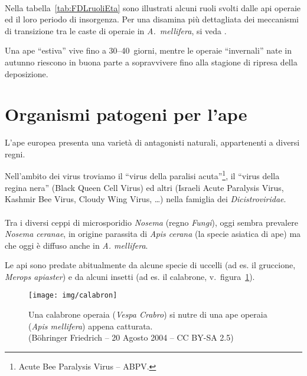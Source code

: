 \paragraph{}
Nella tabella~\ref{tab:FDLruoliEta} sono illustrati alcuni ruoli svolti dalle api operaie ed il loro periodo di insorgenza.
Per una disamina più dettagliata dei meccanismi di transizione tra le caste di operaie in \emph{A.~mellifera},
si veda \cite{meccanica}.

Una ape ``estiva'' vive fino a 30--40~giorni, mentre le operaie ``invernali'' nate in autunno
riescono in buona parte a sopravvivere fino alla stagione di ripresa della deposizione.




\section{Organismi patogeni per l'ape}
L'ape europea presenta una varietà di antagonisti naturali, appartenenti a diversi regni.

Nell'ambito dei virus troviamo il ``virus della paralisi acuta''\footnote{Acute Bee Paralysis Virus -- ABPV.}, il ``virus della regina nera'' (Black Queen Cell Virus) ed altri (Israeli Acute Paralysis Virus, Kashmir Bee Virus, Cloudy Wing Virus, \dots) nella famiglia dei \emph{Dicistroviridae}. %

\paragraph{}
Tra i diversi ceppi di microsporidio \emph{Nosema} (regno \emph{Fungi}),
oggi sembra prevalere \emph{Nosema ceranae},
in origine parassita di \emph{Apis cerana} (la specie asiatica di ape) ma che oggi è diffuso anche in \emph{A. mellifera}.

Le api sono predate abitualmente da alcune specie di uccelli (ad es. il gruccione, \emph{Merops apiaster}) e da alcuni insetti (ad es. il calabrone, v.~figura~\ref{img:calabron}).

\begin{figure}[hbt]
    \centering
    \texttt{[image: img/calabron]}

    \caption[Ape predata da un calabrone.]{Una calabrone operaia (\emph{Vespa Crabro}) si
        nutre di una ape operaia (\emph{Apis mellifera}) appena catturata.
        \\ (Böhringer Friedrich -- 20 Agosto 2004 -- CC BY-SA 2.5)
    }
    \label{img:calabron}
\end{figure}


